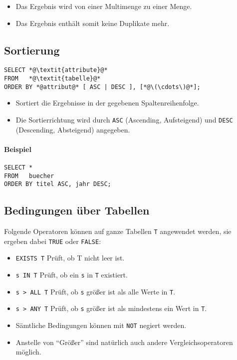             \begin{itemize}
            	\item Das Ergebnis wird von einer Multimenge zu einer Menge.
            	\item Das Ergebnis enthält somit keine Duplikate mehr.
            \end{itemize}

        \subsection{Sortierung} %
        	\begin{lstlisting}
SELECT *@\textit{attribute}@*
FROM   *@\textit{tabelle}@*
ORDER BY *@attribut@* [ ASC | DESC ], [*@\(\cdots\)@*];
        	\end{lstlisting}
        	
        	\begin{itemize}
        		\item Sortiert die Ergebnisse in der gegebenen Spaltenreihenfolge.
        		\item Die Sortierrichtung wird durch \lstinline|ASC| (Ascending, Aufsteigend) und \lstinline|DESC| (Descending, Absteigend) angegeben.
        	\end{itemize}
            
            \paragraph{Beispiel}
            	\begin{lstlisting}
SELECT *
FROM   buecher
ORDER BY titel ASC, jahr DESC;
            	\end{lstlisting}

		\subsection{Bedingungen über Tabellen} %
			Folgende Operatoren können auf ganze Tabellen \texttt{T} angewendet werden, sie ergeben dabei \lstinline|TRUE| oder \lstinline|FALSE|:
			\begin{itemize}
				\item \lstinline|EXISTS T|  \tabto{2.5cm} Prüft, ob T nicht leer ist.
				\item \lstinline|s IN T|    \tabto{2.5cm} Prüft, ob ein \texttt{s} in \texttt{T} existiert.
				\item \lstinline|s > ALL T| \tabto{2.5cm} Prüft, ob \texttt{s} größer ist als alle Werte in \texttt{T}.
				\item \lstinline|s > ANY T| \tabto{2.5cm} Prüft, ob \texttt{s} größer ist als mindestens ein Wert in \texttt{T}.
				\item Sämtliche Bedingungen können mit \lstinline|NOT| negiert werden.
				\item Anstelle von \enquote{Größer} sind natürlich auch andere Vergleichsoperatoren möglich.
			\end{itemize}

